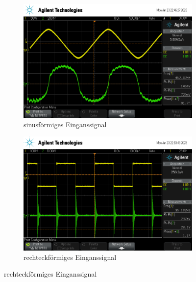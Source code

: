 \begin{figure}
    \centering
    \begin{subfigure}[b]{0.5\textwidth}
        \centering
        \includegraphics[width=\textwidth]{usb/Dif_Sin.png}
        \caption{sinusförmiges Einganssignal}
    \end{subfigure}
    \begin{subfigure}[b]{0.5\textwidth}
        \centering
        \includegraphics[width=\textwidth]{usb/Dif_Recht.png}
        \caption{rechteckförmiges Einganssignal}
    \end{subfigure}


\end{figure}
